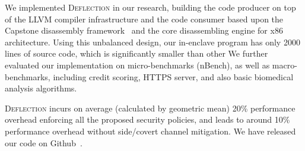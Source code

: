 We implemented \textsc{Deflection} in our research, building the code producer on top of the LLVM compiler infrastructure and the code consumer based upon the Capstone disassembly framework~\cite{capstone} and the core disassembling engine for x86 architecture. 
Using this unbalanced design, our in-enclave program has only 2000 lines of source code, which is significantly smaller than other \DIFdelbegin {}\DIFdelend \DIFaddbegin {}\DIFaddend We further evaluated our implementation on micro-benchmarks (nBench), as well as macro-benchmarks, including credit scoring, HTTPS server, and also basic biomedical analysis algorithms.


\textsc{Deflection} incurs on average (calculated by geometric mean) 20\% performance overhead
enforcing all the proposed security policies, and leads to around 10\% performance overhead
without side/covert channel mitigation.
We have released our code on Github~\cite{our-prototype}.



